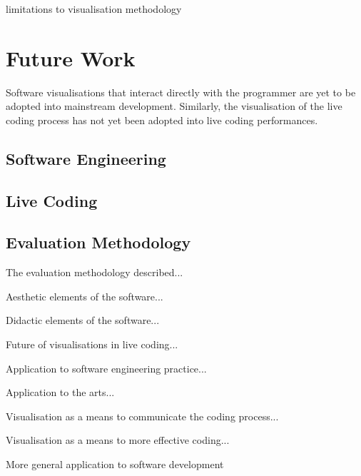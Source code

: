 limitations to visualisation methodology

\section{Future Work}

Software visualisations that interact directly with the programmer are yet to be adopted into mainstream development. Similarly, the visualisation of the live coding process has not yet been adopted into live coding performances.

\subsection{Software Engineering}


\subsection{Live Coding}


\subsection{Evaluation Methodology}

The evaluation methodology described...



Aesthetic elements of the software...

Didactic elements of the software...

Future of visualisations in live coding...

Application to software engineering practice...

Application to the arts...

Visualisation as a means to communicate the coding process...

Visualisation as a means to more effective coding...

More general application to software development


